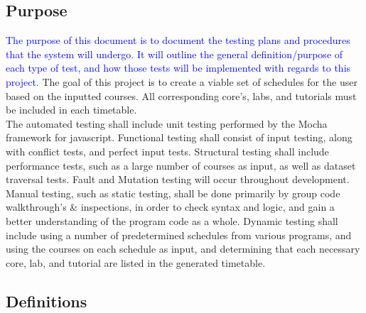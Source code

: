 \documentclass[11pt, oneside]{article}   	%
\begin{document}
\subsection{Purpose}
\textcolor{blue}{The purpose of this document is to document the testing plans and procedures that the system will undergo. It will outline the general definition/purpose of each type of test, and how those tests will be implemented with regards to this project.} The goal of this project is to create a viable set of schedules for the user based on the inputted courses. All corresponding core's, labs, and tutorials must be included in each timetable. \\
The automated testing shall include unit testing performed by the Mocha framework for javascript. Functional testing shall consist of input testing, along with conflict tests, and perfect input tests. Structural testing shall include performance tests, such as a large number of courses as input, as well as dataset traversal tests. Fault and Mutation testing will occur throughout development. Manual testing, such as static testing, shall be done primarily by group code walkthrough's \& inspections, in order to check syntax and logic, and gain a better understanding of the program code as a whole. Dynamic testing shall include using a number of predetermined schedules from various programs, and using the courses on each schedule as input, and determining that each necessary core, lab, and tutorial are listed in the generated timetable. 

\subsection{Definitions}
\end{document}
